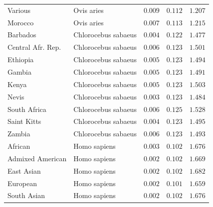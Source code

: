 \documentclass{article}
\begin{document}
\begin{center}
\begin{longtable*}{|l|l|r|r|r|}
            Various &          Ovis aries &               $ 0.009$ &                $ 0.112$ &              $ 1.207$ \\
            Morocco &          Ovis aries &               $ 0.007$ &                $ 0.113$ &              $ 1.215$ \\
            Barbados & Chlorocebus sabaeus &               $ 0.004$ &                $ 0.122$ &              $ 1.477$ \\
            Central Afr. Rep. & Chlorocebus sabaeus &               $ 0.006$ &                $ 0.123$ &              $ 1.501$ \\
            Ethiopia & Chlorocebus sabaeus &               $ 0.005$ &                $ 0.123$ &              $ 1.494$ \\
            Gambia & Chlorocebus sabaeus &               $ 0.005$ &                $ 0.123$ &              $ 1.491$ \\
            Kenya & Chlorocebus sabaeus &               $ 0.005$ &                $ 0.123$ &              $ 1.503$ \\
            Nevis & Chlorocebus sabaeus &               $ 0.003$ &                $ 0.123$ &              $ 1.484$ \\
            South Africa & Chlorocebus sabaeus &               $ 0.006$ &                $ 0.125$ &              $ 1.528$ \\
            Saint Kitts & Chlorocebus sabaeus &               $ 0.004$ &                $ 0.123$ &              $ 1.495$ \\
            Zambia & Chlorocebus sabaeus &               $ 0.006$ &                $ 0.123$ &              $ 1.493$ \\
            African &        Homo sapiens &               $ 0.003$ &                $ 0.102$ &              $ 1.676$ \\
            Admixed American &        Homo sapiens &               $ 0.002$ &                $ 0.102$ &              $ 1.669$ \\
            East Asian &        Homo sapiens &               $ 0.002$ &                $ 0.102$ &              $ 1.682$ \\
            European &        Homo sapiens &               $ 0.002$ &                $ 0.101$ &              $ 1.659$ \\
            South Asian &        Homo sapiens &               $ 0.002$ &                $ 0.102$ &              $ 1.676$ \\
        \end{longtable*}
    \end{center}
\end{document}
